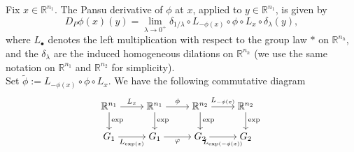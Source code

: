 \documentclass[dvipsnames]{amsart}
\theoremstyle{definition}
\theoremstyle{definition}
\numberwithin{equation}{section}
\begin{document}
Fix $x \in \mathbb R^{n_1}$. The Pansu derivative of $\phi$ at $x$, applied to $y \in \mathbb R^{n_1}$, is given by
\begin{equation*}
     D_P\phi(x) (y) =\lim_{\lambda \rightarrow 0^+} \delta_{1/{\lambda}}\circ L_{-\phi(x)} \circ \phi \circ L_x \circ \delta_{\lambda}(y),
 \end{equation*}
where $L_\bullet$ denotes the left multiplication with respect to the group law $*$ on $\mathbb R^{n_h}$, and the $\delta_\lambda$ are the induced homogeneous dilations on $\mathbb{R}^{n_h}$ (we use the same notation on $\mathbb R^{n_1}$ and $\mathbb R^{n_2}$ for simplicity).\\
Set $\widetilde{\phi}:= L_{-\phi(x)} \circ \phi \circ L_x$. 
We have the following commutative diagram
\begin{equation}\label{commutative diagram charts}
    \begin{tikzcd}[ampersand replacement=\&,cramped]
	{\mathbb{R}^{n_1}} \& {\mathbb{R}^{n_1}} \& {\mathbb{R}^{n_2}} \& {\mathbb{R}^{n_2}} \\
	{G_1} \& {G_1} \& {G_2} \& {G_2}
	\arrow["{L_x}", from=1-1, to=1-2]
	\arrow["\exp", from=1-1, to=2-1]
	\arrow["\phi", from=1-2, to=1-3]
	\arrow["\exp", from=1-2, to=2-2]
	\arrow["{L_{-\phi(x)}}", from=1-3, to=1-4]
	\arrow["\exp", from=1-3, to=2-3]
	\arrow["\exp", from=1-4, to=2-4]
	\arrow["{L_{\exp(x)}}"', from=2-1, to=2-2]
	\arrow["\varphi"', from=2-2, to=2-3]
	\arrow["{L_{\exp(-\phi(x))}}"', from=2-3, to=2-4]
\end{tikzcd}
\end{equation}
\end{document}
